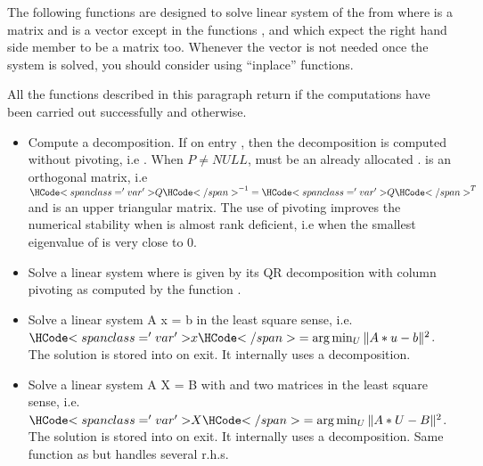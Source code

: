 The following functions are designed to solve linear system of the from  where  is a matrix and  is a vector except in the functions
,  and
 which expect the right hand side member to be a
matrix too. Whenever the vector  is not needed once the system is solved,
you should consider using ``inplace'' functions.


All the functions described in this paragraph return  if the
computations have been carried out successfully and  otherwise.

\begin{itemize}
\item {} 
  \sshortdescribe Compute a  decomposition. If on entry
  , then the decomposition is computed without pivoting, i.e
  . When $P \ne NULL$,  must be an already allocated
  \PnlPermutation.  is an orthogonal matrix, i.e
  $\var{Q}^{-1} = \var{Q}^{T}$ and  is an upper triangular matrix. The
  use of pivoting improves the numerical stability when  is almost rank
  deficient, i.e when the smallest eigenvalue of  is very close to $0$.

\item {}
  \sshortdescribe Solve a linear system  where  is given by
  its QR decomposition with column pivoting as computed by the function
  .
\item {}
  \sshortdescribe Solve a linear system A x = b in the least square sense,
  i.e. $\var{x} = \arg\min_U \| A * u - b\|^2$. The solution is stored into
   on exit. It internally uses a  decomposition.

\item {}
  \sshortdescribe Solve a linear system A X = B with  and  two
  matrices in the least square sense, i.e. $\var{X} = \arg\min_U \| A * U -
  B\|^2$. The solution is stored into  on exit. It internally uses a
   decomposition. Same function as  but handles
  several r.h.s.

\end{itemize}

